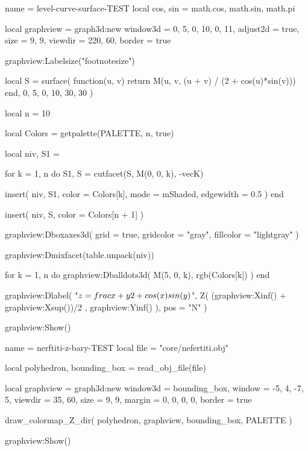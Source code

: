 \begin{luadraw}{name = level-curve-surface-TEST}
local cos, sin = math.cos, math.sin, math.pi

local graphview = graph3d:new{
  window3d = {0, 5, 0, 10, 0, 11},
  adjust2d = true,
  size     = {9, 9},
  viewdir  = {220, 60},
  border   = true
}

graphview:Labelsize("footnotesize")

local S = surface(
  function(u, v)
    return M(u, v, (u + v) / (2 + cos(u)*sin(v)))
  end,
  0, 5, 0, 10,
  {30, 30}
)

local n = 10

local Colors = getpalette(PALETTE, n, true)

local niv, S1 = {}

for k = 1, n do
  S1, S = cutfacet(S, {M(0, 0, k), -vecK})

  insert(
    niv,
    {
      S1,
      {
        color     = Colors[k],
        mode      = mShaded,
        edgewidth = 0.5
      }
    }
  )
end

insert(
  niv,
  {
    S,
    {color = Colors[n + 1]}
  }
)

graphview:Dboxaxes3d({
  grid      = true,
  gridcolor = "gray",
  fillcolor = "lightgray"
})

graphview:Dmixfacet(table.unpack(niv))

for k = 1, n do
  graphview:Dballdots3d(
    M(5, 0, k),
    rgb(Colors[k])
  )
end

graphview:Dlabel(
  "$z = \\frac{x + y}{2 + \\cos(x) \\sin(y)}$",
  Z(
    (graphview:Xinf() + graphview:Xsup())/2 ,
    graphview:Yinf()
  ),
  {pos = "N"}
)

graphview:Show()
\end{luadraw}


\bigskip


\begin{luadraw}{name = nerftiti-z-bary-TEST}
local file = "core/nefertiti.obj"

local polyhedron, bounding_box = read_obj_file(file)

local graphview = graph3d:new{
  window3d = bounding_box,
  window   = {-5, 4, -7, 5},
  viewdir  = {35, 60},
  size     = {9, 9},
  margin   = {0, 0, 0, 0},
  border   = true
}

draw_colormap_Z_dir(
  polyhedron,
  graphview,
  bounding_box,
  PALETTE
)

graphview:Show()
\end{luadraw}


